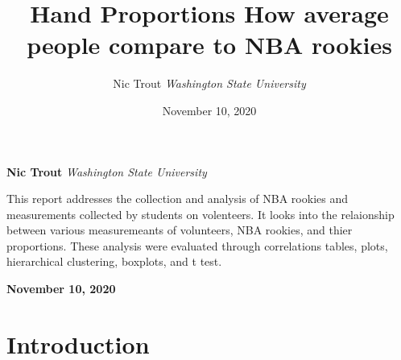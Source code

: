 \documentclass[]{article}
\title{\textbf{\textcolor{WSU.crimson}{Hand
Proportions}} \newline \textbf{\textcolor{WSU.gray}{How average people
compare to NBA rookies}}  }
\author{\Large Nic
Trout\vspace{0.05in} \newline\normalsize\emph{Washington State
University}  }
\date{November 10, 2020}
\newcommand*{\authorfont}{\fontfamily{phv}\selectfont}
\renewenvironment{abstract}
 {{%
    \setlength{\leftmargin}{0mm}
    \setlength{\rightmargin}{\leftmargin}%
  }%
  \relax}
 {\endlist}
\begin{document}
	
%    


{%
\setlength{\parindent}{0pt}
\thispagestyle{plain}
{\fontsize{18}{20}\selectfont\raggedright 
\maketitle  %

}

{
   \vskip 13.5pt\relax \normalsize\fontsize{11}{12} 
   
\textbf{\authorfont Nic Trout} \hskip 15pt \emph{\small Washington State
University}   

}

}








\begin{abstract}

    \hbox{\vrule height .2pt width 39.14pc}

    \vskip 8.5pt %

\noindent This report addresses the collection and analysis of NBA
rookies and measurements collected by students on volenteers. It looks
into the relaionship between various measuremeants of volunteers, NBA
rookies, and thier proportions. These analysis were evaluated through
correlations tables, plots, hierarchical clustering, boxplots, and t
test.


    



    
    \hbox{\vrule height .2pt width 39.14pc}
    \vskip 5pt 
    \hfill \textbf{\textcolor{WSU.gray}{ November 10, 2020 } }
    \vskip 5pt 
    
\end{abstract}


\vskip -8.5pt




\noindent  

\section{Introduction}
\label{sec:intro}
\end{document}
